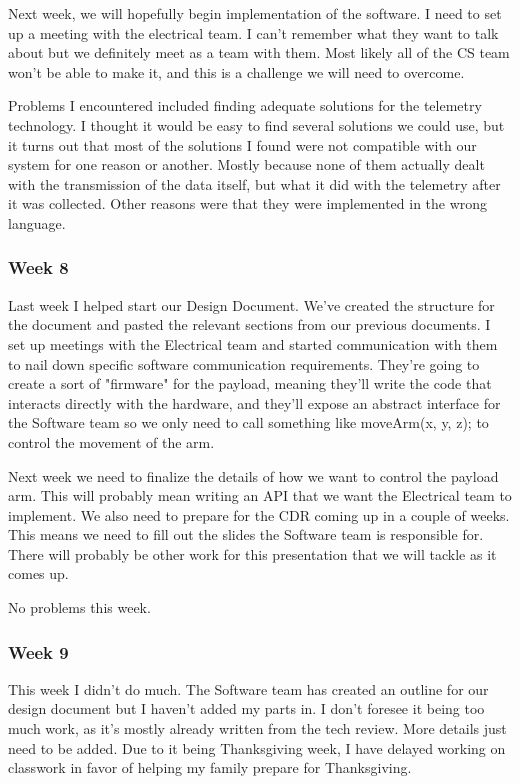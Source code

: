 Next week, we will hopefully begin implementation of the software. I need to set up a meeting with the electrical team. I can't remember what they want to talk about but we definitely meet as a team with them. Most likely all of the CS team won't be able to make it, and this is a challenge we will need to overcome.

Problems I encountered included finding adequate solutions for the telemetry technology. I thought it would be easy to find several solutions we could use, but it turns out that most of the solutions I found were not compatible with our system for one reason or another. Mostly because none of them actually dealt with the transmission of the data itself, but what it did with the telemetry after it was collected. Other reasons were that they were implemented in the wrong language.

\subsubsection{Week 8}
Last week I helped start our Design Document. We've created the structure for the document and pasted the relevant sections from our previous documents. I set up meetings with the Electrical team and started communication with them to nail down specific software communication requirements. They're going to create a sort of "firmware" for the payload, meaning they'll write the code that interacts directly with the hardware, and they'll expose an abstract interface for the Software team so we only need to call something like moveArm(x, y, z); to control the movement of the arm.

Next week we need to finalize the details of how we want to control the payload arm. This will probably mean writing an API that we want the Electrical team to implement. We also need to prepare for the CDR coming up in a couple of weeks. This means we need to fill out the slides the Software team is responsible for. There will probably be other work for this presentation that we will tackle as it comes up.

No problems this week.

\subsubsection{Week 9}
This week I didn't do much. The Software team has created an outline for our design document but I haven't added my parts in. I don't foresee it being too much work, as it's mostly already written from the tech review. More details just need to be added. Due to it being Thanksgiving week, I have delayed working on classwork in favor of helping my family prepare for Thanksgiving.

